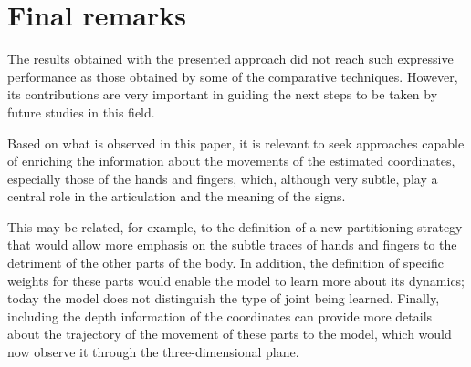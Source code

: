 \section{Final remarks} 
\label{sec:final-remarks}

The results obtained with the presented approach did not reach such expressive performance as those obtained by some of the comparative techniques. However, its contributions are very important in guiding the next steps to be taken by future studies in this field.

Based on what is observed in this paper, it is relevant to seek approaches capable of enriching the information about the movements of the estimated coordinates, especially those of the hands and fingers, which, although very subtle, play a central role in the articulation and the meaning of the signs.

This may be related, for example, to the definition of a new partitioning strategy that would allow more emphasis on the subtle traces of hands and fingers to the detriment of the other parts of the body. In addition, the definition of specific weights for these parts would enable the model to learn more about its dynamics; today the model does not distinguish the type of joint being learned. Finally, including the depth information of the coordinates can provide more details about the trajectory of the movement of these parts to the model, which would now observe it through the three-dimensional plane.





